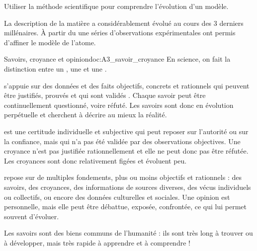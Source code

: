 \teteSndAtom


\begin{objectifs}
  \item Utiliser la méthode scientifique pour comprendre l'évolution d'un modèle.
\end{objectifs}

\begin{contexte}
  La description de la matière a considérablement évolué au cours des 3 derniers millénaires.
  À partir du  une séries d'observations expérimentales ont permis d'affiner le modèle de l'atome.
  
\end{contexte}


\begin{doc}{Savoirs, croyance et opinion}{doc:A3_savoir_croyance}
  En science, on fait la distinction entre un , une  et une .

  \begin{listePoints}
    \item
     s'appuie sur des données et des faits objectifs, concrets et rationnels qui peuvent être justifiés, prouvés et qui sont validés .
    Chaque savoir peut être continuellement questionné, voire réfuté.
    Les savoirs sont donc en évolution perpétuelle et cherchent à décrire au mieux la réalité.
 
    \item 
     est une certitude individuelle et subjective qui peut reposer sur l'autorité ou sur la confiance, mais qui n'a pas été validée par des observations objectives.
    Une croyance n'est pas justifiée rationnellement et elle ne peut donc pas être réfutée.
    Les croyances sont donc relativement figées et évoluent peu.
  
    \item
     repose sur de multiples fondements, plus ou moins objectifs et rationnels : des savoirs, des croyances, des informations de sources diverses, des vécus individuels ou collectifs, ou encore des données culturelles et sociales.
    Une opinion est personnelle, mais elle peut être débattue, exposée, confrontée, ce qui lui permet souvent d'évoluer.
  \end{listePoints}

  Les savoirs sont des biens communs de l'humanité : ils sont très long à trouver ou à développer, mais très rapide à apprendre et à comprendre !
\end{doc}


